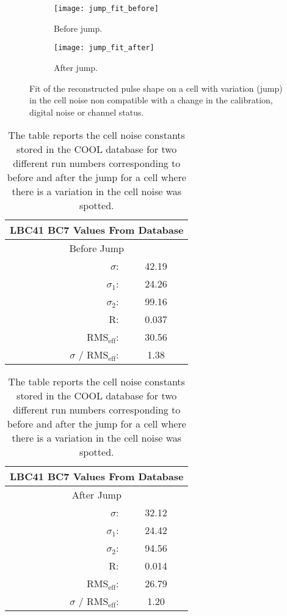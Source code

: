 \begin{figure}[!h]
  \centering
  \begin{subfigure}[t]{.48\linewidth}
    \texttt{[image: jump\_fit\_before]}
    \caption{Before jump.}
    \label{fig:jump_fit_before}
  \end{subfigure}
  \begin{subfigure}[t]{.48\linewidth}
    \texttt{[image: jump\_fit\_after]}
    \caption{After jump.}
    \label{fig:jump_fit_after}
  \end{subfigure}
  \caption{Fit of the reconstructed pulse shape on a cell with variation (jump)
    in the cell noise non compatible with a change in the calibration, digital
    noise or channel status.}
  \label{fig:jump_fit}
\end{figure}

\begin{table}[!h]
  \centering
  \begin{tabular}{r c}
    \multicolumn{2}{c}{LBC41 BC7 Values From Database} \\
    \hline \hline
    \multicolumn{2}{c}{Before Jump} \\
    \hline \hline
    $\sigma$: & 42.19 \\
    $\sigma_1$: & 24.26 \\
    $\sigma_2$: & 99.16 \\
    R\@: & 0.037 \\
    RMS$_{\text{eff}}$: & 30.56 \\
    $\sigma$ / RMS$_{\text{eff}}$: & 1.38 \\
    \hline \hline
  \end{tabular} \quad
  \begin{tabular}{r c}
    \multicolumn{2}{c}{LBC41 BC7 Values From Database} \\
    \hline \hline
    \multicolumn{2}{c}{After Jump} \\
    \hline \hline
    $\sigma$: & 32.12 \\
    $\sigma_1$: & 24.42 \\
    $\sigma_2$: & 94.56 \\
    R\@: & 0.014 \\
    RMS$_{\text{eff}}$: & 26.79 \\
    $\sigma$ / RMS$_{\text{eff}}$: & 1.20 \\
    \hline \hline
  \end{tabular}
  \caption{The table reports the cell noise constants stored in the COOL
    database for two different run numbers corresponding to before and after the
  jump for a cell where there is a variation in the cell noise was spotted.}
  \label{tab:jump_fit}
\end{table}

